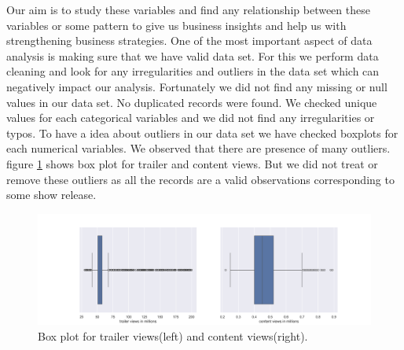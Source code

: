 \documentclass[12pt,a4paper]{style}
\begin{document}
 Our aim is to study these variables and find any relationship between these variables or some pattern to give us business insights and help us with strengthening business strategies. One of the most important aspect of data analysis is making sure that we have valid data set. For this we perform data cleaning and look for any irregularities and outliers in the data set which can negatively impact our analysis. Fortunately we did not find any missing or null values in our data set. No duplicated records were found. We checked unique values for each categorical variables and we did not find any irregularities or typos. To have a idea about outliers in our data set we have checked  boxplots for each numerical variables. We observed that there are presence of many outliers. figure \ref{fig:outlier} shows box plot for trailer and content views. But we did not treat or remove these outliers as all the records are a valid observations corresponding to some show release. 
 \begin{figure}
 	\centering
 	\includegraphics[width=\textwidth]{outlier.png}
 	\caption{Box plot for trailer views(left) and content views(right). }
 	\label{fig:outlier}
 \end{figure}
\end{document}
